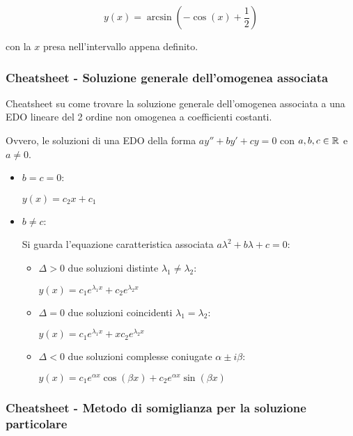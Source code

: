 \[
    y(x) = \arcsin \left( -\cos(x) +\frac{1}{2} \right)
\]

con la \(x\) presa nell'intervallo appena definito.

\pagebreak
\subsubsection{Cheatsheet {-} Soluzione generale dell'omogenea associata}

Cheatsheet su come trovare la soluzione generale dell'omogenea associata a una EDO lineare del 2 ordine non omogenea a coefficienti costanti.

Ovvero, le soluzioni di una EDO della forma \(ay''+by'+cy=0\) con \(a,b,c \in \mathbb{R} \) e \(a \ne 0\).

\begin{itemize}
    \item \(b=c=0\):

          \(y(x) = c_{2}x + c_{1}\)

    \item \(b \ne c\):

          Si guarda l'equazione caratteristica associata \(a\lambda^2 + b\lambda + c =0\):
          \begin{itemize}
              \item \(\Delta > 0\) due soluzioni distinte \(\lambda_1 \ne \lambda_2\):

                    \smallskip
                    \(y(x) = c_{1}e^{\lambda_{1}x} + c_{2}e^{\lambda_{2}x}\)
                    \medskip
              \item \(\Delta = 0\) due soluzioni coincidenti \(\lambda_1=\lambda_2\):

                    \smallskip
                    \(y(x) = c_{1}e^{\lambda_{1}x} + xc_{2}e^{\lambda_{2}x}\)
                    \medskip
              \item \(\Delta < 0\) due soluzioni complesse coniugate \(\alpha \pm i\beta \):

                    \smallskip
                    \(y(x) = c_{1}e^{\alpha x}\cos(\beta x) + c_{2}e^{\alpha x}\sin(\beta x)\)
                    \medskip
          \end{itemize}
\end{itemize}

\pagebreak
\subsubsection{Cheatsheet {-} Metodo di somiglianza per la soluzione particolare}\label{sec:cheatsheet-edo-2-ordine-soluzione-particolare}

